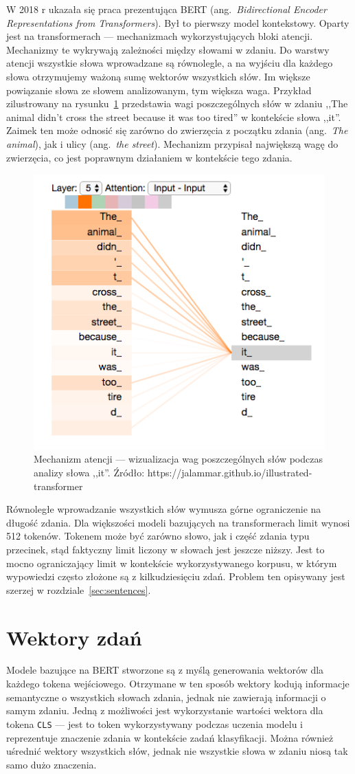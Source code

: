 	W 2018 r ukazała się praca prezentująca BERT (ang.\ \emph{Bidirectional Encoder Representations from Transformers})\cite{BERT}.
	Był to pierwszy model kontekstowy.
	Oparty jest na transformerach\cite{Transformers} --- mechanizmach wykorzystujących bloki atencji.
	Mechanizmy te wykrywają zależności między słowami w zdaniu.
	Do warstwy atencji wszystkie słowa wprowadzane są równolegle, a na wyjściu dla każdego słowa otrzymujemy ważoną sumę wektorów wszystkich słów.
	Im większe powiązanie słowa ze słowem analizowanym, tym większa waga.
	Przykład zilustrowany na rysunku~\ref{fig:attention} przedstawia wagi poszczególnych słów w zdaniu ,,The animal didn't cross the street because it was too tired'' w kontekście słowa ,,it''.
	Zaimek ten może odnosić się zarówno do zwierzęcia z początku zdania (ang.\ \emph{The animal}), jak i ulicy (ang.\ \emph{the street}).
	Mechanizm przypisał największą wagę do zwierzęcia, co jest poprawnym działaniem w kontekście tego zdania.
	\begin{figure}[htb]
		\centering
		\includegraphics[width=.5\textwidth]{rys03/transformer_attention.png}
		\caption[Mechanizm atencji — wizualizacja wag]{Mechanizm atencji --- wizualizacja wag poszczególnych słów podczas analizy słowa ,,it''.
			Źródło: https://jalammar.github.io/illustrated-transformer}\label{fig:attention}
	\end{figure}
	
	Równoległe wprowadzanie wszystkich słów wymusza górne ograniczenie na długość zdania.
	Dla większości modeli bazujących na transformerach limit wynosi 512 tokenów.
	Tokenem może być zarówno słowo, jak i część zdania typu przecinek, stąd faktyczny limit liczony w słowach jest jeszcze niższy.
	Jest to mocno ograniczający limit w kontekście wykorzystywanego korpusu, w którym wypowiedzi często złożone są z kilkudziesięciu zdań.
	Problem ten opisywany jest szerzej w rozdziale~\ref{sec:sentences}.

\section{Wektory zdań}
	Modele bazujące na BERT stworzone są z myślą generowania wektorów dla każdego tokena wejściowego.
	Otrzymane w ten sposób wektory kodują informacje semantyczne o wszystkich słowach zdania, jednak nie zawierają informacji o samym zdaniu.
	Jedną z możliwości jest wykorzystanie wartości wektora dla tokena \verb|CLS| --- jest to token wykorzystywany podczas uczenia modelu i reprezentuje znaczenie zdania w kontekście zadań klasyfikacji\cite{BERT}.
	Można również uśrednić wektory wszystkich słów, jednak nie wszystkie słowa w zdaniu niosą tak samo dużo znaczenia.
	
